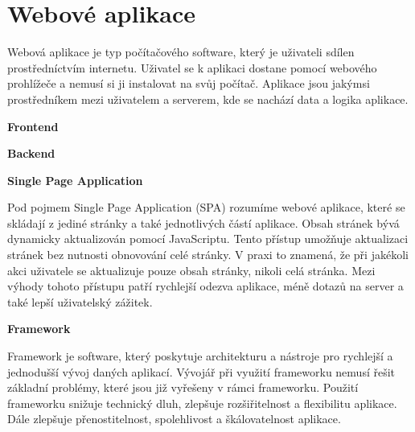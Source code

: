 \section{Webové aplikace}

Webová aplikace je typ počítačového software, který je uživateli sdílen prostředníctvím internetu. 
Uživatel se k aplikaci dostane pomocí webového prohlížeče a nemusí si ji instalovat na svůj počítač. 
Aplikace jsou jakýmsi prostředníkem mezi uživatelem a serverem, kde se nachází data a logika aplikace.\cite{codeacademywebapp}

\begin{flushleft}
  \textbf{Frontend}
\end{flushleft}


\begin{flushleft}
  \textbf{Backend}
\end{flushleft}


\begin{flushleft}
  \textbf{Single Page Application}
\end{flushleft}

Pod pojmem Single Page Application (SPA) rozumíme webové aplikace, které se skládají z jediné stránky a také jednotlivých částí aplikace. 
Obsah stránek bývá dynamicky aktualizován pomocí JavaScriptu. Tento přístup umožňuje aktualizaci stránek bez nutnosti obnovování celé stránky. 
V praxi to znamená, že při jakékoli akci uživatele se aktualizuje pouze obsah stránky, nikoli celá stránka. 
Mezi výhody tohoto přístupu patří rychlejší odezva aplikace, méně dotazů na server a také lepší uživatelský zážitek.\cite{jadhavspa}

\begin{flushleft}
  \textbf{Framework}
\end{flushleft}

Framework je software, který poskytuje architekturu a nástroje pro rychlejší a jednodušší vývoj daných aplikací. 
Vývojář při využití frameworku nemusí řešit základní problémy, které jsou již vyřešeny v rámci frameworku. 
Použití frameworku snižuje technický dluh, zlepšuje rozšiřitelnost a flexibilitu aplikace. 
Dále zlepšuje přenostitelnost, spolehlivost a škálovatelnost aplikace.\cite{schmidtframeworks}